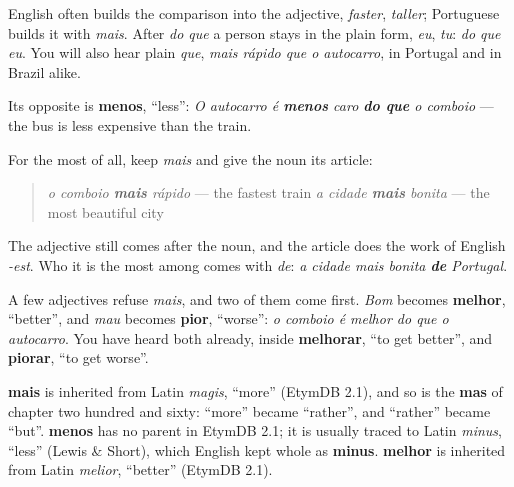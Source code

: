 English often builds the comparison into the adjective, \emph{faster}, \emph{taller}; Portuguese builds it with \emph{mais}. After \emph{do que} a person stays in the plain form, \emph{eu}, \emph{tu}: \emph{do que eu}. You will also hear plain \emph{que}, \emph{mais rápido que o autocarro}, in Portugal and in Brazil alike.

Its opposite is \textbf{menos}, \textquotedblleft{}less\textquotedblright{}: \emph{O autocarro é \textbf{menos} caro \textbf{do que} o comboio} — the bus is less expensive than the train.

\begin{grammarlens}[title={Grammar Lens: o mais, and two that refuse}]
For the most of all, keep \emph{mais} and give the noun its article:

\begin{quote}
\emph{o comboio \textbf{mais} rápido} — the fastest train \emph{a cidade \textbf{mais} bonita} — the most beautiful city
\end{quote}

The adjective still comes after the noun, and the article does the work of English \emph{-est}. Who it is the most among comes with \emph{de}: \emph{a cidade mais bonita \textbf{de} Portugal}.

A few adjectives refuse \emph{mais}, and two of them come first. \emph{Bom} becomes \textbf{melhor}, \textquotedblleft{}better\textquotedblright{}, and \emph{mau} becomes \textbf{pior}, \textquotedblleft{}worse\textquotedblright{}: \emph{o comboio é melhor do que o autocarro}. You have heard both already, inside \textbf{melhorar}, \textquotedblleft{}to get better\textquotedblright{}, and \textbf{piorar}, \textquotedblleft{}to get worse\textquotedblright{}.
\end{grammarlens}

\begin{cousinweb}
\textbf{mais} is inherited from Latin \emph{magis}, \textquotedblleft{}more\textquotedblright{} (EtymDB 2.1), and so is the \textbf{mas} of chapter two hundred and sixty: \textquotedblleft{}more\textquotedblright{} became \textquotedblleft{}rather\textquotedblright{}, and \textquotedblleft{}rather\textquotedblright{} became \textquotedblleft{}but\textquotedblright{}. \textbf{menos} has no parent in EtymDB 2.1; it is usually traced to Latin \emph{minus}, \textquotedblleft{}less\textquotedblright{} (Lewis \& Short), which English kept whole as \textbf{minus}. \textbf{melhor} is inherited from Latin \emph{melior}, \textquotedblleft{}better\textquotedblright{} (EtymDB 2.1).
\end{cousinweb}

